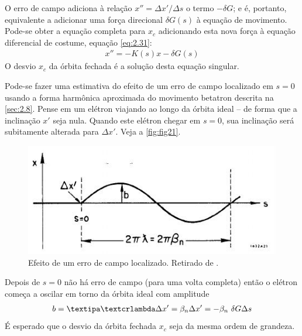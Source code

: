 O erro de campo adiciona à relação $x'' = \Delta x'/ \Delta s$ o termo $-\delta G$; e é, portanto, equivalente a adicionar uma força direcional $\delta G(s)$ à equação de movimento. Pode-se obter a equação completa para $x_c$ adicionando esta nova força à equação diferencial de costume, equação \eqref{eq:2.31}:
\begin{align}
	x'' = -K(s)x - \delta G(s)
\end{align}
O desvio $x_c$ da órbita fechada é a solução desta equação singular.

Pode-se fazer uma estimativa do efeito de um erro de campo localizado em $s=0$ usando a forma harmônica aproximada do movimento betatron descrita na \autoref{sec:2.8}. Pense em um elétron viajando ao longo da órbita ideal -- de forma que a inclinação $x'$ seja nula. Quando este elétron chegar em $s=0$, sua inclinação será subitamente alterada para $\Delta x'$. Veja a \autoref{fig:fig21}. 

\begin{figure}[!htb]
	\centering
	\includegraphics[width=0.7\linewidth]{./Figuras/fig21.jpeg}
	\caption{Efeito de um erro de campo localizado. Retirado de \cite{sands1970physics}.}
	\label{fig:fig21}
\end{figure}
Depois de $s=0$ não há erro de campo (para uma volta completa) então o elétron começa a oscilar em torno da órbita ideal com amplitude
\begin{align}
	b = \lambdabar \Delta x' = \beta_n \Delta x' = -\beta_n\ \delta G \Delta s\label{eq:2.86}
\end{align}
É esperado que o desvio da órbita fechada $x_c$ seja da mesma ordem de grandeza.

